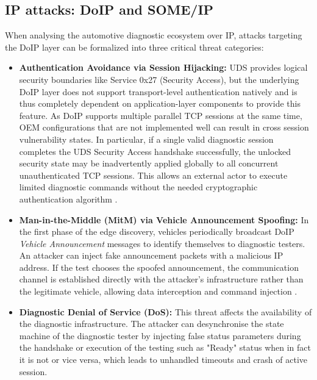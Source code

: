 \subsection{IP attacks: DoIP and SOME/IP}

When analysing the automotive diagnostic ecosystem over IP, attacks targeting the \gls{DoIP} layer can be formalized into three critical threat categories:

\begin{itemize}
    \item \textbf{Authentication Avoidance via Session Hijacking:} \gls{UDS} provides logical security boundaries like Service 0\textnormal{x}27 (Security Access), but the underlying \gls{DoIP} layer does not support transport-level authentication natively and is thus completely dependent on application-layer components to provide this feature. As \gls{DoIP} supports multiple parallel \gls{TCP} sessions at the same time, \gls{OEM} configurations that are not implemented well can result in cross session vulnerability states. In particular, if a single valid diagnostic session completes the \gls{UDS} Security Access handshake successfully, the unlocked security state may be inadvertently applied globally to all concurrent unauthenticated \gls{TCP} sessions. This allows an external actor to execute limited diagnostic commands without the needed cryptographic authentication algorithm \cite{DoIPAttack}.
    
    \item \textbf{Man-in-the-Middle (MitM) via Vehicle Announcement Spoofing:} In the first phase of the edge discovery, vehicles periodically broadcast \gls{DoIP} \textit{Vehicle Announcement} messages to identify themselves to diagnostic testers. An attacker can inject fake announcement packets with a malicious IP address. If the test chooses the spoofed announcement, the communication channel is established directly with the attacker's infrastructure rather than the legitimate vehicle, allowing data interception and command injection \cite{DoIPAttack}.
    
    \item \textbf{Diagnostic Denial of Service (DoS):} This threat affects the availability of the diagnostic infrastructure. The attacker can desynchronise the state machine of the diagnostic tester by injecting false status parameters during the handshake or execution of the testing such as "Ready" status when in fact it is not or vice versa, which leads to unhandled timeouts and crash of active session.
\end{itemize}


